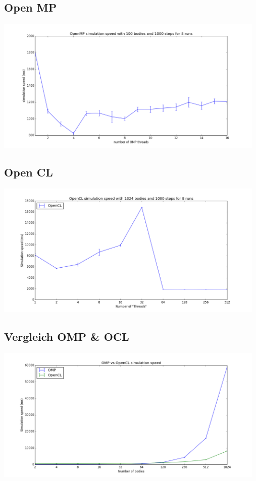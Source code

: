 \documentclass{beamer}
\begin{document}
\subsection{Open MP}
\begin{frame}
\includegraphics[width=13cm]{img/fig_omp_100b_1000s_8r.png}
\end{frame}

\subsection{Open CL}
\begin{frame}
\includegraphics[width=13cm]{img/fig_ocl_1024b_1000s_8r.png}
\end{frame}

\subsection{Vergleich OMP \& OCL}
\begin{frame}
\includegraphics[width=13cm]{img/fig_omp_and_ocl.png}
\end{frame}
\end{document}
